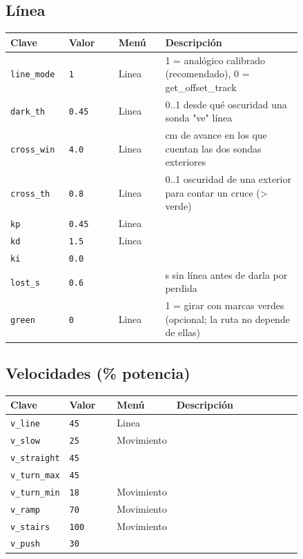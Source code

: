 \subsection*{Línea}
\begin{longtable}{@{}p{0.2\linewidth}p{0.17\linewidth}lp{0.47\linewidth}@{}}\toprule
\textbf{Clave} & \textbf{Valor} & \textbf{Men\'u} & \textbf{Descripci\'on} \\\midrule\endhead
\texttt{line\_\allowbreak{}mode} & \texttt{1} & Linea & 1 = analógico calibrado (recomendado), 0 = get\_offset\_track \\
\texttt{dark\_\allowbreak{}th} & \texttt{0.45} & Linea & 0..1 desde qué oscuridad una sonda "ve" línea \\
\texttt{cross\_\allowbreak{}win} & \texttt{4.0} & Linea & cm de avance en los que cuentan las dos sondas exteriores \\
\texttt{cross\_\allowbreak{}th} & \texttt{0.8} & Linea & 0..1 oscuridad de una exterior para contar un cruce (> verde) \\
\texttt{kp} & \texttt{0.45} & Linea &  \\
\texttt{kd} & \texttt{1.5} & Linea &  \\
\texttt{ki} & \texttt{0.0} &  &  \\
\texttt{lost\_\allowbreak{}s} & \texttt{0.6} &  & s sin línea antes de darla por perdida \\
\texttt{green} & \texttt{0} & Linea & 1 = girar con marcas verdes (opcional; la ruta no depende de ellas) \\
\bottomrule\end{longtable}
\subsection*{Velocidades (\% potencia)}
\begin{longtable}{@{}p{0.2\linewidth}p{0.17\linewidth}lp{0.47\linewidth}@{}}\toprule
\textbf{Clave} & \textbf{Valor} & \textbf{Men\'u} & \textbf{Descripci\'on} \\\midrule\endhead
\texttt{v\_\allowbreak{}line} & \texttt{45} & Linea &  \\
\texttt{v\_\allowbreak{}slow} & \texttt{25} & Movimiento &  \\
\texttt{v\_\allowbreak{}straight} & \texttt{45} &  &  \\
\texttt{v\_\allowbreak{}turn\_\allowbreak{}max} & \texttt{45} &  &  \\
\texttt{v\_\allowbreak{}turn\_\allowbreak{}min} & \texttt{18} & Movimiento &  \\
\texttt{v\_\allowbreak{}ramp} & \texttt{70} & Movimiento &  \\
\texttt{v\_\allowbreak{}stairs} & \texttt{100} & Movimiento &  \\
\texttt{v\_\allowbreak{}push} & \texttt{30} &  &  \\
\bottomrule\end{longtable}

